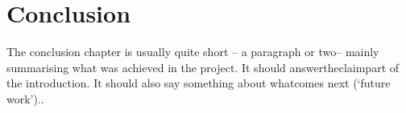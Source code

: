 \chapter{Conclusion}

The conclusion chapter is usually quite short – a paragraph or two– mainly summarising what was achieved in the project. It should answertheclaimpart of the introduction. It should also say something about whatcomes next (‘future work’)..
